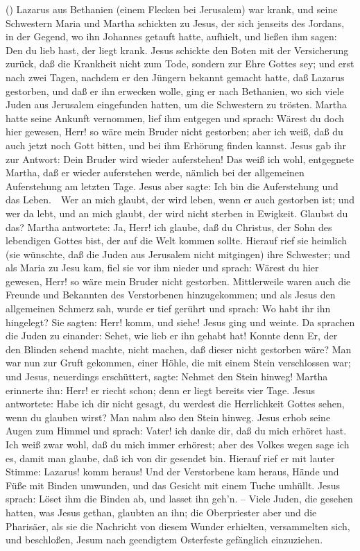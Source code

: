 \begin{aufza}
\item {} () Lazarus aus Bethanien (einem Flecken bei Jerusalem) war krank, und seine Schwestern Maria und Martha schickten zu Jesus, der sich jenseits des Jordans, in der Gegend, wo ihn Johannes getauft hatte, aufhielt, und ließen ihm sagen: Den du lieb hast, der liegt krank. Jesus schickte den Boten mit der Versicherung zurück, daß die Krankheit nicht zum Tode, sondern zur Ehre Gottes sey; und erst nach zwei Tagen, nachdem er den Jüngern bekannt gemacht hatte, daß Lazarus gestorben, und daß er ihn erwecken wolle, ging er nach Bethanien, wo sich viele Juden aus Jerusalem eingefunden hatten, um die Schwestern zu trösten. Martha hatte seine Ankunft vernommen, lief ihm entgegen und sprach: Wärest du doch hier gewesen, Herr! so wäre mein Bruder nicht gestorben; aber ich weiß, daß du auch jetzt noch Gott bitten, und bei ihm Erhörung finden kannst. Jesus gab ihr zur Antwort: Dein Bruder wird wieder auferstehen! Das weiß ich wohl, entgegnete Martha, daß er wieder auferstehen werde, nämlich bei der allgemeinen Auferstehung am letzten Tage. Jesus aber sagte: Ich bin die Auferstehung und das Leben.~\ Wer an mich glaubt, der wird leben, wenn er auch gestorben ist; und wer da lebt, und an mich glaubt, der wird nicht sterben in Ewigkeit. Glaubst du das? Martha antwortete: Ja, Herr! ich glaube, daß du Christus, der Sohn des lebendigen Gottes bist, der auf die Welt kommen sollte. Hierauf rief sie heimlich (sie wünschte, daß die Juden aus Jerusalem nicht mitgingen) ihre Schwester; und als Maria zu Jesu kam, fiel sie vor ihm nieder und sprach: Wärest du hier gewesen, Herr! so wäre mein Bruder nicht gestorben. Mittlerweile waren auch die Freunde und Bekannten des Verstorbenen hinzugekommen; und als Jesus den allgemeinen Schmerz sah, wurde er tief gerührt und sprach: Wo habt ihr ihn hingelegt? Sie sagten: Herr! komm, und siehe! Jesus ging und weinte. Da sprachen die Juden zu einander: Sehet, wie lieb er ihn gehabt hat! Konnte denn Er, der den Blinden sehend machte, nicht machen, daß dieser nicht gestorben wäre? Man war nun zur Gruft gekommen, einer Höhle, die mit einem Stein verschlossen war; und Jesus, neuerdings erschüttert, sagte: Nehmet den Stein hinweg! Martha erinnerte ihn: Herr! er riecht schon; denn er liegt bereits vier Tage. Jesus antwortete: Habe ich dir nicht gesagt, du werdest die Herrlichkeit Gottes sehen, wenn du glauben wirst? Man nahm also den Stein hinweg. Jesus erhob seine Augen zum Himmel und sprach: Vater! ich danke dir, daß du mich erhöret hast. Ich weiß zwar wohl, daß du mich immer erhörest; aber des Volkes wegen sage ich es, damit man glaube, daß ich von dir gesendet bin. Hierauf rief er mit lauter Stimme: Lazarus! komm heraus! Und der Verstorbene kam heraus, Hände und Füße mit Binden umwunden, und das Gesicht mit einem Tuche umhüllt. Jesus sprach: Löset ihm die Binden ab, und lasset ihn geh'n. -- Viele Juden, die gesehen hatten, was Jesus gethan, glaubten an ihn; die Oberpriester aber und die Pharisäer, als sie die Nachricht von diesem Wunder erhielten, versammelten sich, und beschloßen, Jesum nach geendigtem Osterfeste gefänglich einzuziehen.\par

\end{aufza}
